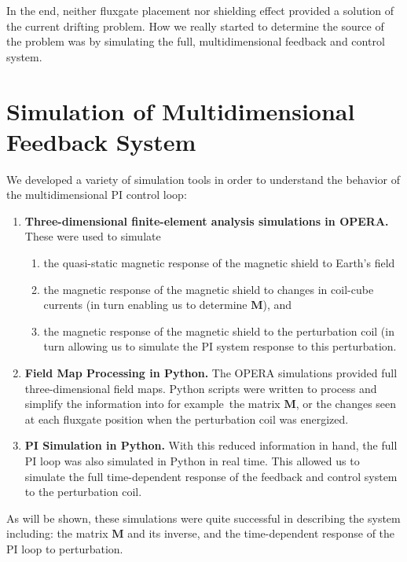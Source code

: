 

In the end, neither fluxgate placement nor shielding effect provided a
solution of the current drifting problem.  How we really started to
determine the source of the problem was by simulating the full,
multidimensional feedback and control system.

\section{Simulation of Multidimensional Feedback System}\label{sec:pSim}

We developed a variety of simulation tools in order to understand the
behavior of the multidimensional PI control loop:
\begin{enumerate}
\item {\bf Three-dimensional finite-element analysis simulations in OPERA.}  These were used to simulate
\begin{enumerate}
\item the quasi-static magnetic response of the magnetic shield to Earth's field
\item the magnetic response of the magnetic shield to changes in coil-cube currents (in turn enabling us to determine $\bm{M}$), and
\item the magnetic response of the magnetic shield to the perturbation coil (in turn allowing us to simulate the PI system response to this perturbation.
\end{enumerate}
\item {\bf Field Map Processing in Python.}  The OPERA simulations provided full three-dimensional field maps.  Python scripts were written to process and simplify the information into for example~the matrix $\bm{M}$, or the changes seen at each fluxgate position when the perturbation coil was energized.
\item {\bf PI Simulation in Python.}  With this reduced information in hand, the full PI loop was also simulated in Python in real time.  This allowed us to simulate the full time-dependent response of the feedback and control system to the perturbation coil.
\end{enumerate}
As will be shown, these simulations were quite successful in
describing the system including: the matrix $\bm{M}$ and its
inverse, and the time-dependent response of the PI loop to
perturbation.

